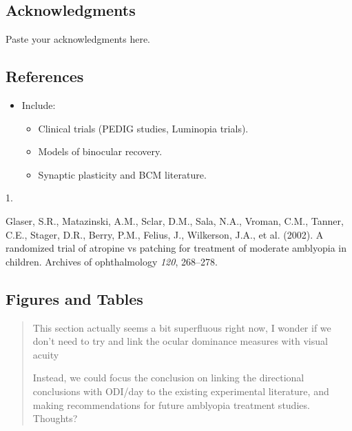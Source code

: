 \documentclass[
]{article}
\newlength{\cslhangindent}
\newlength{\csllabelwidth}
\newenvironment{CSLReferences}[2] %
 {\begin{list}{}{%
  \setlength{\itemindent}{0pt}
  \setlength{\leftmargin}{0pt}
  \setlength{\parsep}{0pt}
  \ifodd #1
   \setlength{\leftmargin}{\cslhangindent}
   \setlength{\itemindent}{-1\cslhangindent}
  \fi
  \setlength{\itemsep}{#2\baselineskip}}}
 {\end{list}}
\newcommand{\CSLLeftMargin}[1]{\parbox[t]{\csllabelwidth}{\strut#1\strut}}
\newcommand{\CSLRightInline}[1]{\parbox[t]{\linewidth - \csllabelwidth}{\strut#1\strut}}
\providecommand{\tightlist}{%
  \setlength{\itemsep}{0pt}\setlength{\parskip}{0pt}}
\begin{document}
\subsection{Acknowledgments}\label{sec:acknowledgments}

Paste your acknowledgments here.

\subsection{References}\label{sec:references}

\begin{itemize}
\tightlist
\item[$\square$]
  Include:

  \begin{itemize}
  \tightlist
  \item[$\square$]
    Clinical trials (PEDIG studies, Luminopia trials).
  \item[$\square$]
    Models of binocular recovery.
  \item[$\square$]
    Synaptic plasticity and BCM literature.
  \end{itemize}
\end{itemize}

\protect{}\label{refs}
\begin{CSLReferences}{0}{1}
\CSLLeftMargin{1. }%
\CSLRightInline{Glaser, S.R., Matazinski, A.M., Sclar, D.M., Sala, N.A.,
Vroman, C.M., Tanner, C.E., Stager, D.R., Berry, P.M., Felius, J.,
Wilkerson, J.A., et al. (2002). A randomized trial of atropine vs
patching for treatment of moderate amblyopia in children. Archives of
ophthalmology \emph{120}, 268--278.}

\end{CSLReferences}

\subsection{Figures and Tables}\label{sec:figures-and-tables}

\begin{quote}
This section actually seems a bit superfluous right now, I wonder if we
don't need to try and link the ocular dominance measures with visual
acuity

Instead, we could focus the conclusion on linking the directional
conclusions with ODI/day to the existing experimental literature, and
making recommendations for future amblyopia treatment studies. Thoughts?
\end{quote}
\end{document}
